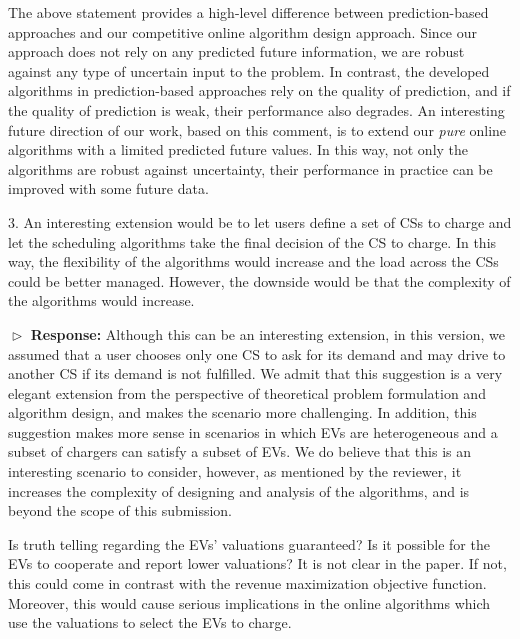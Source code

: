 \documentclass[11pt]{article}
\begin{document}
The above statement provides a high-level difference between prediction-based approaches and our competitive online algorithm design approach. Since our approach does not rely on any predicted future information, we are robust against any type of uncertain input to the problem. In contrast, the developed algorithms in prediction-based approaches rely on the quality of prediction, and if the quality of prediction is weak, their performance also degrades. An interesting future direction of our work, based on this comment, is to extend our \textit{pure} online algorithms with a limited predicted future values. In this way, not only the algorithms are robust against uncertainty, their performance in practice can be improved with some future data. 

\vspace{3mm}
{\color{blue} 3. An interesting extension would be to let users define a set of CSs to charge and let the scheduling algorithms take the final decision of the CS to charge. In this way, the flexibility of the algorithms would increase and the load across the CSs could be better managed. However, the downside would be that the complexity of the algorithms would increase. }
\vspace{3mm}

$\vartriangleright$ \noindent\textbf{Response:} 
Although this can be an interesting extension, in this version, we assumed that a user chooses only one CS to ask for its demand and may drive to another CS if its demand is not fulfilled. We admit that this suggestion is a very elegant extension from the perspective of theoretical problem formulation and algorithm design, and makes the scenario more challenging. In addition, this suggestion makes more sense in scenarios in which EVs are heterogeneous and a subset of chargers can satisfy a subset of EVs. We do believe that this is an interesting scenario to consider, however, as mentioned by the reviewer, it increases the complexity of designing and analysis of the algorithms, and is beyond the scope of this submission. 

\vspace{3mm}
{\color{blue} Is truth telling regarding the EVs’ valuations guaranteed? Is it possible for the EVs to cooperate and report lower valuations? It is not clear in the paper. If not, this could come in contrast with the revenue maximization objective function. Moreover, this would cause serious implications in the online algorithms which use the valuations to select the EVs to charge.}
\vspace{3mm}
\end{document}
